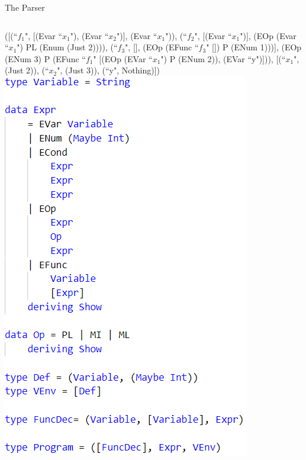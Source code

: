 \documentclass{beamer}
\begin{document}
\begin{frame}{The Parser}
	\begin{columns}
		([(``$f_1$", [(Evar ``$x_1$"), (Evar ``$x_2$")], (Evar ``$x_1$")), (``$f_2$", [(Evar ``$x_1$")], (EOp (Evar ``$x_1$") PL (Enum (Just 2)))), (``$f_3$", [], (EOp (EFunc ``$f_3$" []) P (ENum 1)))],
		(EOp (ENum 3) P (EFunc ``$f_1$" [(EOp (EVar ``$x_1$") P (ENum 2)), (EVar ``y")])), [(``$x_1$", (Just 2)), (``$x_2$", (Just 3)), (``y", Nothing)])
		\includegraphics[scale=0.6]{img/code8}
	\end{columns}
\end{frame}
\end{document}
